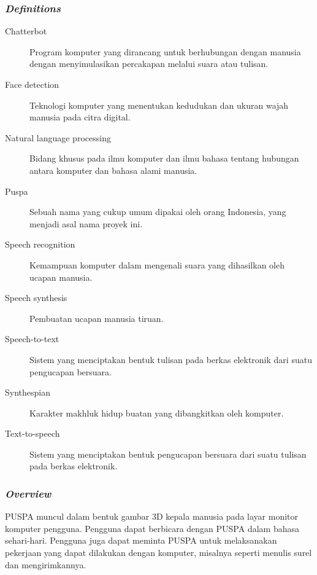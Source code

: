 \subsubsection*{\textit{Definitions}}

\begin{description}
\item[Chatterbot] Program komputer yang dirancang untuk berhubungan dengan manusia dengan menyimulasikan percakapan melalui suara atau tulisan.
\item[Face detection] Teknologi komputer yang menentukan kedudukan dan ukuran wajah manusia pada citra digital.
\item[Natural language processing] Bidang khusus pada ilmu komputer dan ilmu bahasa tentang hubungan antara komputer dan bahasa alami manusia.
\item[Puspa] Sebuah nama yang cukup umum dipakai oleh orang Indonesia, yang menjadi asal nama proyek ini.
\item[Speech recognition] Kemampuan komputer dalam mengenali suara yang dihasilkan oleh ucapan manusia.
\item[Speech synthesis] Pembuatan ucapan manusia tiruan.
\item[Speech-to-text] Sistem yang menciptakan bentuk tulisan pada berkas elektronik dari suatu pengucapan bersuara.
\item[Synthespian] Karakter makhluk hidup buatan yang dibangkitkan oleh komputer.
\item[Text-to-speech] Sistem yang menciptakan bentuk pengucapan bersuara dari suatu tulisan pada berkas elektronik.
\end{description}


\subsubsection*{\textit{Overview}}

PUSPA muncul dalam bentuk gambar 3D kepala manusia pada layar monitor komputer pengguna.
Pengguna dapat berbicara dengan PUSPA dalam bahasa sehari-hari. Pengguna juga dapat meminta PUSPA untuk melaksanakan pekerjaan yang dapat dilakukan dengan komputer, misalnya seperti menulis surel dan mengirimkannya.
